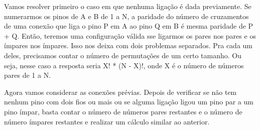 Vamos resolver primeiro o caso em que nenhuma ligação é dada previamente. Se numerarmos os pinos de A e B de 1 a N, a paridade do número de cruzamentos de uma conexão que liga o pino P em A ao pino Q em B é mesma paridade de P + Q. Então, teremos uma configuração válida sse ligarmos os pares nos pares e os ímpares nos ímpares. Isso nos deixa com dois problemas separados. Pra cada um deles, precisamos contar o número de permutações de um certo tamanho. Ou seja, nesse caso a resposta seria X! * (N - X)!, onde X é o número de números pares de 1 a N.

Agora vamos considerar as conexões prévias. Depois de verificar se não tem nenhum pino com dois fios ou mais ou se alguma ligação ligou um pino par a um pino ímpar, basta contar o número de números pares restantes e o número de número ímpares restantes e realizar um cálculo similar ao anterior.
